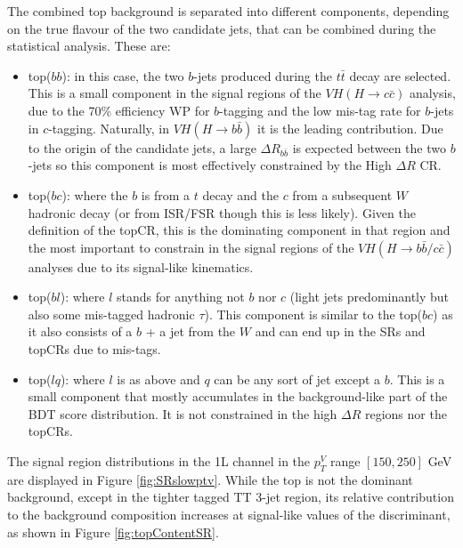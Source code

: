 The combined top background is separated into different components, depending on the true flavour of the two candidate jets, that can be combined during the statistical analysis. These are:
\begin{itemize}
\item top($bb$): in this case, the two $b$-jets produced during the $t\bar{t}$ decay are selected. This is a small component in the signal regions of the $VH(H\rightarrow c\bar{c})$ analysis, due to the 70\% efficiency WP for $b$-tagging and the low mis-tag rate for $b$-jets in $c$-tagging. Naturally, in $VH(H\rightarrow b\bar{b})$ it is the leading contribution. Due to the origin of the candidate jets, a large $\Delta R_{b\bar{b}}$ is expected between the two $b$-jets so this component is most effectively constrained by the High $\Delta R$ CR. 
\item top($bc$): where the $b$ is from a $t$ decay and the $c$ from a subsequent $W$ hadronic decay (or from ISR/FSR though this is less likely). Given the definition of the topCR, this is the dominating component in that region and the most important to constrain in the signal regions of the $VH(H\rightarrow b\bar{b}/c\bar{c})$ analyses due to its signal-like kinematics. 
\item top($bl$): where $l$ stands for anything not $b$ nor $c$ (light jets predominantly but also some mis-tagged hadronic $\tau$). This component is similar to the top($bc$) as it also consists of a $b$ + a jet from the $W$ and can end up in the SRs and topCRs due to mis-tags.
\item top($lq$): where $l$ is as above and $q$ can be any sort of jet except a $b$. This is a small component that mostly accumulates in the background-like part of the BDT score distribution. It is not constrained in the high $\Delta R$ regions nor the topCRs.
\end{itemize}
The signal region distributions in the 1L channel in the $p_T^V$ range $[150, 250]$ GeV are displayed in Figure \ref{fig:SRslowptv}. While the top is not the dominant background, except in the tighter tagged TT 3-jet region, its relative contribution to the background composition increases at signal-like values of the discriminant, as shown in Figure \ref{fig:topContentSR}. \\

